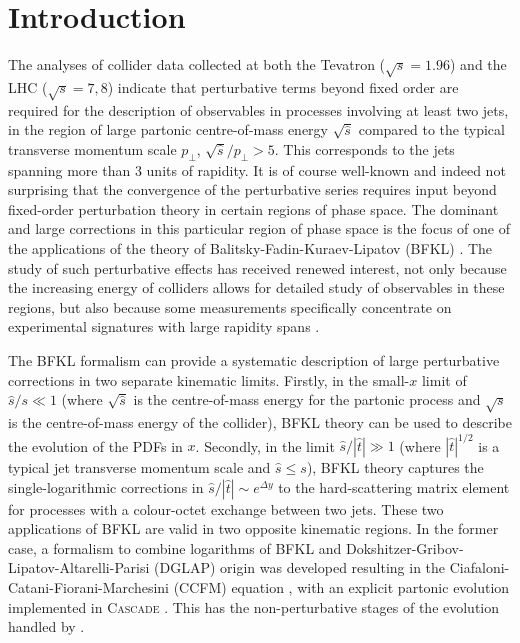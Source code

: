 \section{Introduction}
\label{sec:intro}
The analyses of collider data collected at both the Tevatron \cite{Abazov:2013gpa}
($\sqrt{s}=1.96$\TeV) and the LHC \cite{Aad:2011jz,Aad:2014pua,Aad:2014qxa,Chatrchyan:2012gwa,Aad:2015nda,Khachatryan:2016udy}
($\sqrt{s}=7,8$\TeV)
indicate that perturbative terms beyond fixed order are required for the
description of observables in processes involving at least two jets, in the
region of large partonic centre-of-mass energy $\sqrt{\hat s}$ compared to
the typical transverse momentum scale $p_\perp$,
$\sqrt{\hat s}/p_\perp>5$. This corresponds to the jets spanning
more than 3 units of rapidity. It is of course well-known
and indeed not surprising that the convergence of the perturbative series
requires input beyond fixed-order perturbation theory in certain regions of
phase space. The dominant and large corrections in this particular region of
phase space is the focus of one of the applications of the theory of
Balitsky-Fadin-Kuraev-Lipatov
(BFKL) \cite{Fadin:1975cb,Kuraev:1976ge,Kuraev:1977fs,Balitsky:1978ic}. The
study of such perturbative effects has received renewed interest, not only because the
increasing energy of colliders allows for detailed study of
observables in these regions, but also because some 
measurements specifically concentrate on experimental signatures with 
large rapidity spans \cite{Chatrchyan:2012pb,Chatrchyan:2012gwa,Chatrchyan:2013jya,Aad:2014pua,Aad:2014qxa,Aad:2015nda,Khachatryan:2016udy,Aaboud:2017fye}.

The BFKL formalism can provide a systematic description of large
perturbative corrections in two separate kinematic 
limits. Firstly, in the small-$x$ limit of $\hat{s}/s\ll 1$ (where $\sqrt{\hat{s}}$ is
the centre-of-mass energy for the partonic process and $\sqrt{s}$ is the
centre-of-mass energy of the collider), BFKL theory can be used to
describe the evolution of the PDFs in $x$. Secondly, in the limit $\hat s/|\hat t|\gg 1$
(where $|\hat t|^{1/2}$ is a typical jet transverse momentum scale and
$\hat s\le s$), BFKL theory captures the single-logarithmic
corrections in $\hat s/|\hat t| \sim e^{\Delta y}$ to the hard-scattering matrix element for
processes with a colour-octet exchange between two jets. These two applications
of BFKL are valid in two opposite kinematic regions. 
In the former case, a formalism to combine logarithms of BFKL and
Dokshitzer-Gribov-Lipatov-Altarelli-Parisi
(DGLAP) \cite{Dokshitzer:1977sg,Gribov:1972ri,Altarelli:1977zs} origin
was developed resulting in the Ciafaloni-Catani-Fiorani-Marchesini
(CCFM) equation \cite{Ciafaloni:1987ur,Catani:1989yc,Catani:1989sg,Marchesini:1994wr},
with an explicit partonic evolution implemented in
\textsc{Cascade} \cite{Jung:2000hk,Jung:2010si}. This has the non-perturbative stages of
the evolution handled by \pysix\cite{Sjostrand:2006za}.

